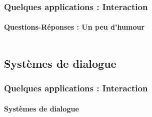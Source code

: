 \documentclass[xcolor=table]{beamer}
\begin{document}
\begin{frame}
	\frametitle{Quelques applications : Interaction}
	\framesubtitle{Questions-Réponses : Un peu d'humour}
	
	\begin{columns}
		\begin{column}{0.3\textwidth}
			
		\end{column}
		\begin{column}{0.4\textwidth}
		\end{column}
	\end{columns}

\end{frame}

\subsection{Systèmes de dialogue}

\begin{frame}
	\frametitle{Quelques applications : Interaction}
	\framesubtitle{Systèmes de dialogue}
\end{frame}
\end{document}
